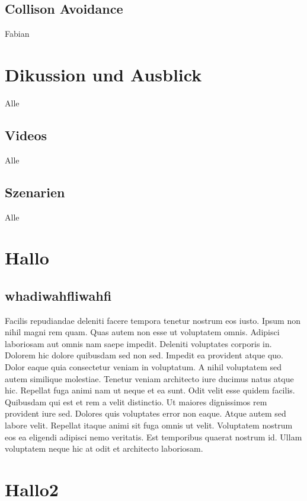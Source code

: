 \documentclass[
a4paper,     %
12pt         %
]{scrartcl}  %
\begin{document}
\subsection{Collison Avoidance}
Fabian

\section{Dikussion und Ausblick}
Alle
\subsection{Videos}
Alle
\subsection{Szenarien}
Alle




\section{Hallo}
\subsection{whadiwahfliwahfi}
Facilis repudiandae deleniti facere tempora tenetur nostrum eos iusto. Ipsum non nihil magni rem quam. Quas autem non esse ut voluptatem omnis.
Adipisci laboriosam aut omnis nam saepe impedit. Deleniti voluptates corporis in. Dolorem hic dolore quibusdam sed non sed.
Impedit ea provident atque quo. Dolor eaque quia consectetur veniam in voluptatum. A nihil voluptatem sed autem similique molestiae. Tenetur veniam architecto iure ducimus natus atque hic. Repellat fuga animi nam ut neque et ea sunt. Odit velit esse quidem facilis.
Quibusdam qui est et rem a velit distinctio. Ut maiores dignissimos rem provident iure sed. Dolores quis voluptates error non eaque. Atque autem sed labore velit. Repellat itaque animi sit fuga omnis ut velit.
Voluptatem nostrum eos ea eligendi adipisci nemo veritatis. Est temporibus quaerat nostrum id. Ullam voluptatem neque hic at odit et architecto laboriosam.
\section{Hallo2}










% 

% 
\end{document}

